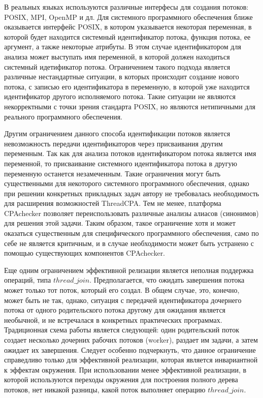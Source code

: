 В реальных языках используются различные интерфесы для создания потоков: POSIX, MPI, OpenMP и дл. 
Для системного программного обеспечения ближе оказывается интерфейс POSIX, в котором указывается некоторая переменная, в которой будет находится системный идентификатор потока, функция потока, ее аргумент, а также некоторые атрибуты. 
В этом случае идентификатором для анализа может выступать имя переменной, в которой должен находиться системный идетификатор потока.
Ограничением такого подхода является различные нестандартные ситуации, в которых происходит создание нового потока, с записью его идентификатора в переменную, в которой уже находится идентификатор другого исполняемого потока.
Такие ситуации не являются некорректными с точки зрения стандарта POSIX, но являются нетипичными для реального программного обеспечения.

Другим ограничением данного способа идентификации потоков является невозможность передачи идентификаторов через присваивания другим переменным. 
Так как для анализа потоков идентификатором потока является имя переменной, то присваивание системного идентификатора потока в другую переменную останется незамеченным.
Такие ограничения могут быть существенными для некоторого системного программного обеспечения, однако при решении конкретных прикладных задач автору не требовалась необходимость для расширения возможностей ThreadCPA.
Тем не менее, платформа CPAchecker позволяет переиспользовать различные анализы алиасов (синонимов) для решения этой задачи. 
Таким образом, такое ограничение хотя и может оказаться существенным для специфического программного обеспечения, само по себе не является критичным, и в случае необходимости может быть устранено с помощью существующих компонентов CPAchecker.

Еще одним ограничением эффективной релизации является неполная поддержка операций, типа $thread\_join$. 
Предполагается, что ожидать завершения потока может только тот поток, который его создал.
В общем случае, это, конечно, может быть не так, однако, ситуация с передачей идентификатора дочернего потока от одного родительского потока другому для ожидания является необычной, и не встречалася в конкретных практических программах. 
Традиционная схема работы является следующей: один родительский поток создает несколько дочерних рабочих потоков (worker), раздает им задачи, а затем ожидает их завершения. 
Следует особенно подчеркнуть, что данное ограничение справедливо только для эффективной реализации, которая является инвариантной к эффектам окружения.
При использовании менее эффективной реализации, в которой используются переходы окружения для построения полного дерева потоков, нет никакой разницы, какой поток выполняет операцию $thread\_join$.

